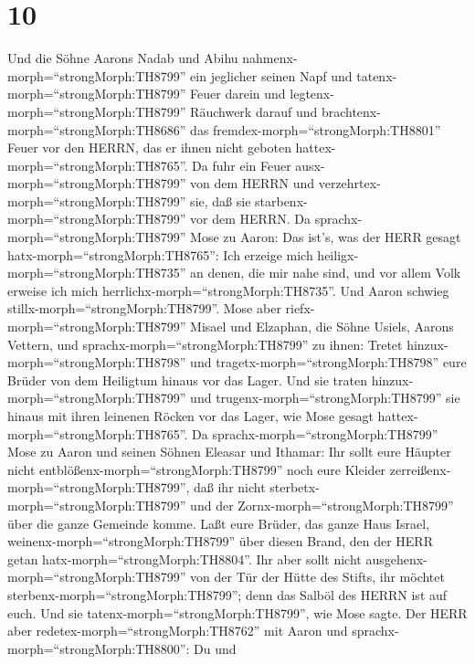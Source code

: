 \hypertarget{section-9}{%
\section{10}\label{section-9}}

 Und die Söhne Aarons Nadab und Abihu
nahmenx-morph=``strongMorph:TH8799'' ein jeglicher seinen Napf und
tatenx-morph=``strongMorph:TH8799'' Feuer darein und
legtenx-morph=``strongMorph:TH8799'' Räuchwerk darauf und
brachtenx-morph=``strongMorph:TH8686'' das
fremdex-morph=``strongMorph:TH8801'' Feuer vor den HERRN, das er ihnen
nicht geboten hattex-morph=``strongMorph:TH8765''.  Da fuhr
ein Feuer ausx-morph=``strongMorph:TH8799'' von dem HERRN und
verzehrtex-morph=``strongMorph:TH8799'' sie, daß sie
starbenx-morph=``strongMorph:TH8799'' vor dem HERRN.  Da
sprachx-morph=``strongMorph:TH8799'' Mose zu Aaron: Das ist's, was der
HERR gesagt hatx-morph=``strongMorph:TH8765'': Ich erzeige mich
heiligx-morph=``strongMorph:TH8735'' an denen, die mir nahe sind, und
vor allem Volk erweise ich mich herrlichx-morph=``strongMorph:TH8735''.
Und Aaron schwieg stillx-morph=``strongMorph:TH8799''.  Mose
aber riefx-morph=``strongMorph:TH8799'' Misael und Elzaphan, die Söhne
Usiels, Aarons Vettern, und sprachx-morph=``strongMorph:TH8799'' zu
ihnen: Tretet hinzux-morph=``strongMorph:TH8798'' und
tragetx-morph=``strongMorph:TH8798'' eure Brüder von dem Heiligtum
hinaus vor das Lager.  Und sie traten
hinzux-morph=``strongMorph:TH8799'' und
trugenx-morph=``strongMorph:TH8799'' sie hinaus mit ihren leinenen
Röcken vor das Lager, wie Mose gesagt
hattex-morph=``strongMorph:TH8765''.  Da
sprachx-morph=``strongMorph:TH8799'' Mose zu Aaron und seinen Söhnen
Eleasar und Ithamar: Ihr sollt eure Häupter nicht
entblößenx-morph=``strongMorph:TH8799'' noch eure Kleider
zerreißenx-morph=``strongMorph:TH8799'', daß ihr nicht
sterbetx-morph=``strongMorph:TH8799'' und der
Zornx-morph=``strongMorph:TH8799'' über die ganze Gemeinde komme. Laßt
eure Brüder, das ganze Haus Israel, weinenx-morph=``strongMorph:TH8799''
über diesen Brand, den der HERR getan hatx-morph=``strongMorph:TH8804''.
 Ihr aber sollt nicht ausgehenx-morph=``strongMorph:TH8799''
von der Tür der Hütte des Stifts, ihr möchtet
sterbenx-morph=``strongMorph:TH8799''; denn das Salböl des HERRN ist auf
euch. Und sie tatenx-morph=``strongMorph:TH8799'', wie Mose sagte.
 Der HERR aber redetex-morph=``strongMorph:TH8762'' mit
Aaron und sprachx-morph=``strongMorph:TH8800'':  Du und
